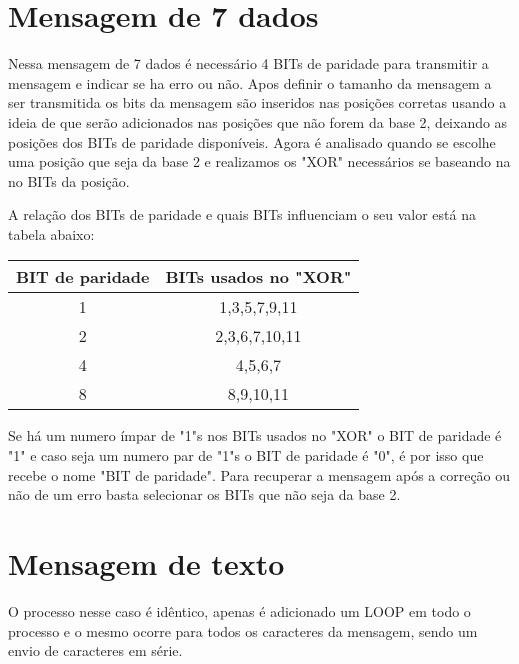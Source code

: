 \documentclass{article}
\begin{document}
    \section{Mensagem de 7 dados}
        Nessa mensagem de 7 dados é necessário 4 BITs de paridade para transmitir a mensagem e indicar se ha erro ou não.
        Apos definir o tamanho da mensagem a ser transmitida os bits da mensagem são inseridos nas posições corretas usando a ideia de que serão adicionados nas posições que não forem da base 2, deixando as posições dos BITs de paridade disponíveis. Agora é analisado quando se escolhe uma posição que seja da base 2 e realizamos os "XOR" necessários se baseando na no BITs da posição.
        
        A relação dos BITs de paridade e quais BITs influenciam o seu valor está na tabela abaixo:
        \begin{center}
            \begin{tabular}{|c | c |} 
                \hline
                BIT de paridade & BITs usados no "XOR" \\ [0.5ex] 
                \hline
                1 & 1,3,5,7,9,11\\ 
                \hline
                2 & 2,3,6,7,10,11\\
                \hline
                4 & 4,5,6,7\\
                \hline
                8 & 8,9,10,11\\
                \hline
            \end{tabular}
        \end{center}
        Se há um numero ímpar de "1"s nos BITs usados no "XOR" o BIT de paridade é "1" e caso seja um numero par de "1"s o BIT de paridade é "0", é por isso que recebe o nome "BIT de paridade". Para recuperar a mensagem após a correção ou não de um erro basta selecionar os BITs que não seja da base 2.
    \section{Mensagem de texto}
        O processo nesse caso é idêntico, apenas é adicionado um LOOP em todo o processo e o mesmo ocorre para todos os caracteres da mensagem, sendo um envio de caracteres em série.
    
\end{document}
